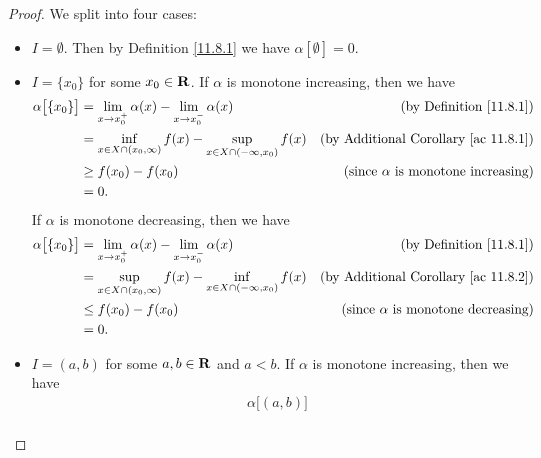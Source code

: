 \begin{proof}
    We split into four cases:
    \begin{itemize}
        \item \(I = \emptyset\).
              Then by Definition \ref{11.8.1} we have \(\alpha[\emptyset] = 0\).
        \item \(I = \{x_0\}\) for some \(x_0 \in \mathbf{R}\).
              If \(\alpha\) is monotone increasing, then we have
              \begin{align*}
                  \alpha\big[\{x_0\}\big] & = \lim_{x \to x_0^+} \alpha(x) - \lim_{x \to x_0^-} \alpha(x)                      & \text{(by Definition \ref{11.8.1})}              \\
                                          & = \inf_{x \in X \cap (x_0, \infty)} f(x) - \sup_{x \in X \cap (-\infty, x_0)} f(x) & \text{(by Additional Corollary \ref{ac 11.8.1})} \\
                                          & \geq f(x_0) - f(x_0)                                                               & \text{(since \(\alpha\) is monotone increasing)} \\
                                          & = 0.
              \end{align*}
              If \(\alpha\) is monotone decreasing, then we have
              \begin{align*}
                  \alpha\big[\{x_0\}\big] & = \lim_{x \to x_0^+} \alpha(x) - \lim_{x \to x_0^-} \alpha(x)                      & \text{(by Definition \ref{11.8.1})}              \\
                                          & = \sup_{x \in X \cap (x_0, \infty)} f(x) - \inf_{x \in X \cap (-\infty, x_0)} f(x) & \text{(by Additional Corollary \ref{ac 11.8.2})} \\
                                          & \leq f(x_0) - f(x_0)                                                               & \text{(since \(\alpha\) is monotone decreasing)} \\
                                          & = 0.
              \end{align*}
        \item \(I = (a, b)\) for some \(a, b \in \mathbf{R}\) and \(a < b\).
              If \(\alpha\) is monotone increasing, then we have
              \begin{align*}
                   & \alpha\big[(a, b)\big]                                                                                                                                \\

\end{align*}
\end{itemize}
\end{proof}

